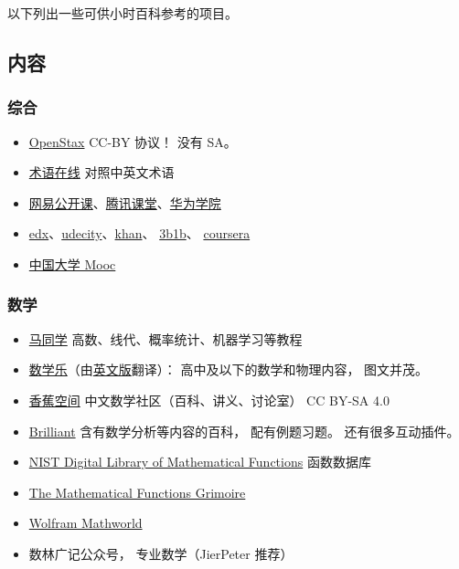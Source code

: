 
以下列出一些可供小时百科参考的项目。

\subsection{内容}
\subsubsection{综合}
\begin{itemize}
\item \href{https://openstax.org}{OpenStax} CC-BY 协议！ 没有 SA。
\item \href{https://www.termonline.cn/index}{术语在线} 对照中英文术语
\item \href{https://open.163.com}{网易公开课}、\href{https://ke.qq.com}{腾讯课堂}、\href{https://edu.huaweicloud.com}{华为学院}
\item \href{https://www.edx.org}{edx}、\href{https://www.udacity.com}{udecity}、\href{https://www.khanacademy.org}{khan}、 \href{https://www.youtube.com/@3blue1brown}{3b1b}、 \href{https://www.coursera.org}{coursera}
\item \href{https://www.icourse163.org}{中国大学 Mooc}
\end{itemize}

\subsubsection{数学}
\begin{itemize}
\item \href{https://www.matongxue.com}{马同学} 高数、线代、概率统计、机器学习等教程
\item \href{https://www.shuxuele.com}{数学乐}（由\href{https://www.mathsisfun.com}{英文版}翻译）： 高中及以下的数学和物理内容， 图文并茂。
\item \href{https://www.bananaspace.org/wiki}{香蕉空间} 中文数学社区（百科、讲义、讨论室） CC BY-SA 4.0
\item \href{https://brilliant.org}{Brilliant} 含有数学分析等内容的百科， 配有例题习题。 还有很多互动插件。
\item \href{https://dlmf.nist.gov}{NIST Digital Library of Mathematical Functions} 函数数据库
\item \href{https://fungrim.org}{The Mathematical Functions Grimoire}
\item \href{https://mathworld.wolfram.com}{Wolfram Mathworld}
\item 数林广记公众号， 专业数学（JierPeter 推荐）
\end{itemize}

